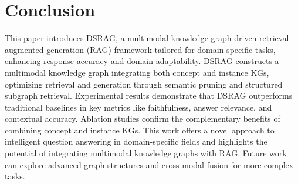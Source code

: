 \documentclass[runningheads]{llncs}
\begin{document}
\section{Conclusion}\label{Work5}
	This paper introduces DSRAG, a multimodal knowledge graph-driven retrieval-augmented generation (RAG) framework tailored for domain-specific tasks, enhancing response accuracy and domain adaptability. DSRAG constructs a multimodal knowledge graph integrating both concept and instance KGs, optimizing retrieval and generation through semantic pruning and structured subgraph retrieval. Experimental results demonstrate that DSRAG outperforms traditional baselines in key metrics like faithfulness, answer relevance, and contextual accuracy. Ablation studies confirm the complementary benefits of combining concept and instance KGs. This work offers a novel approach to intelligent question answering in domain-specific fields and highlights the potential of integrating multimodal knowledge graphs with RAG. Future work can explore advanced graph structures and cross-modal fusion for more complex tasks.


    




\end{document}
